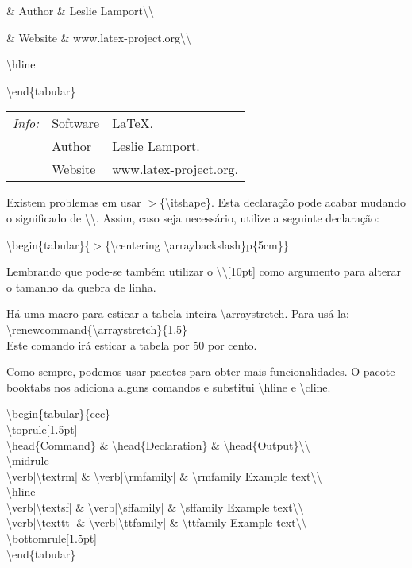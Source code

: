 	      \& Author \& Leslie Lamport\textbackslash \textbackslash 

	      \& Website \& www.latex-project.org\textbackslash \textbackslash 

	\textbackslash hline

\textbackslash end\{tabular\}

\sffamily

\setlength{\extrarowheight}{4pt}
\begin{tabular}{@{}>{\itshape}ll!{:}l<{.}@{}}
	\hline
	Info: & Software & \LaTeX \\
	      & Author & Leslie Lamport\\
	      & Website & www.latex-project.org\\
	\hline
\end{tabular}

\setlength{\extrarowheight}{0pt} %

Existem problemas em usar $>$\{\textbackslash itshape\}. Esta declaração pode
acabar mudando o significado de \textbackslash \textbackslash. Assim, caso seja
necessário, utilize a seguinte declaração:

\textbackslash begin\{tabular\}\{$>$\{\textbackslash centering \textbackslash arraybackslash\}p\{5cm\}\}

Lembrando que pode-se também utilizar o \textbackslash \textbackslash [10pt]
como argumento para alterar o tamanho da quebra de linha.

Há uma macro para esticar a tabela inteira \textbackslash arraystretch. Para
usá-la:\\
\textbackslash renewcommand\{\textbackslash arraystretch\}\{1.5\}\\
\indent Este comando irá esticar a tabela por 50 por cento.

Como sempre, podemos usar pacotes para obter mais funcionalidades. O pacote
booktabs nos adiciona alguns comandos e substitui \textbackslash hline e
\textbackslash cline.

\ttfamily
\noindent\textbackslash begin\{tabular\}\{ccc\}\\
	\textbackslash toprule[1.5pt]\\
	\textbackslash head\{Command\} \& \textbackslash head\{Declaration\} \& \textbackslash head\{Output\}\textbackslash \textbackslash \\
	\textbackslash midrule\\
	\textbackslash verb|\textbackslash textrm| \& \textbackslash verb|\textbackslash rmfamily| \& \textbackslash rmfamily Example text\textbackslash \textbackslash \\
	\textbackslash hline\\
	\textbackslash verb|\textbackslash textsf| \& \textbackslash verb|\textbackslash sffamily| \& \textbackslash sffamily Example text\textbackslash \textbackslash \\
	\textbackslash verb|\textbackslash texttt| \& \textbackslash verb|\textbackslash ttfamily| \& \textbackslash ttfamily Example text\textbackslash \textbackslash \\
	\textbackslash bottomrule[1.5pt]\\
\textbackslash end\{tabular\}\\
\sffamily


